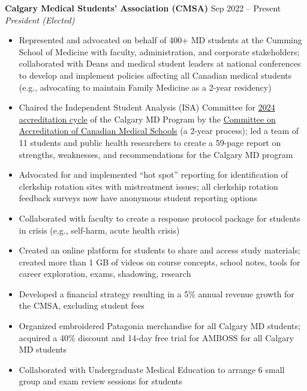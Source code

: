 \documentclass{article}
\begin{document}
\textbf{Calgary Medical Students' Association (CMSA)} \hfill Sep 2022 -- Present \\
\textit{President (Elected)}
\begin{itemize}
    \item Represented and advocated on behalf of 400+ MD students at the Cumming School of Medicine with faculty, administration, and corporate stakeholders; collaborated with Deans and medical student leaders at national conferences to develop and implement policies affecting all Canadian medical students (e.g., advocating to maintain Family Medicine as a 2-year residency)
    \item Chaired the Independent Student Analysis (ISA) Committee for \href{https://cumming.ucalgary.ca/about/ume-accreditation}{2024 accreditation cycle} of the Calgary MD Program by the \href{https://cacms-cafmc.ca/}{Committee on Accreditation of Canadian Medical Schools} (a 2-year process); led a team of 11 students and public health researchers to create a 59-page report on strengths, weaknesses, and recommendations for the Calgary MD program
    \item Advocated for and implemented ``hot spot'' reporting for identification of clerkship rotation sites with mistreatment issues; all clerkship rotation feedback surveys now have anonymous student reporting options
    \item Collaborated with faculty to create a response protocol package for students in crisis (e.g., self-harm, acute health crisis)
    \item Created an online platform for students to share and access study materials; created more than 1 GB of videos on course concepts, school notes, tools for career exploration, exams, shadowing, research
    \item Developed a financial strategy resulting in a 5\% annual revenue growth for the CMSA, excluding student fees
    \item Organized embroidered Patagonia merchandise for all Calgary MD students; acquired a 40\% discount and 14-day free trial for AMBOSS for all Calgary MD students
    \item Collaborated with Undergraduate Medical Education to arrange 6 small group and exam review sessions for students
\end{itemize} \vspace{1em}
\end{document}
